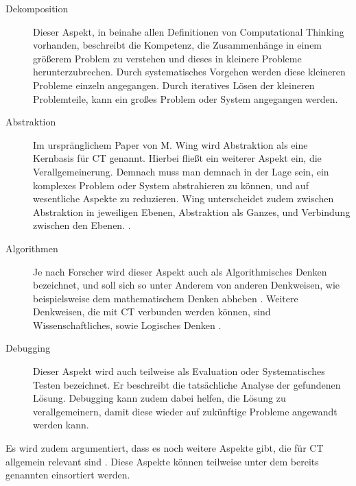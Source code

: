 \begin{description}
    \item[Dekomposition] Dieser Aspekt, in beinahe allen Definitionen von Computational Thinking vorhanden, beschreibt die Kompetenz, die Zusammenhänge in einem größerem Problem zu verstehen und dieses in kleinere Probleme herunterzubrechen. Durch systematisches Vorgehen werden diese kleineren Probleme einzeln angegangen. Durch iteratives Lösen der kleineren Problemteile, kann ein großes Problem oder System angegangen werden.
    \item[Abstraktion] Im urspränglichem Paper von M. Wing wird Abstraktion als eine Kernbasis für CT genannt. Hierbei fließt ein weiterer Aspekt ein, die Verallgemeinerung.
    Demnach muss man demnach in der Lage sein, ein komplexes Problem oder System abstrahieren zu können, und auf wesentliche Aspekte zu reduzieren. Wing unterscheidet zudem zwischen Abstraktion in jeweiligen Ebenen, Abstraktion als Ganzes, und Verbindung zwischen den Ebenen. \cite{wing2008}.
    \item[Algorithmen] Je nach Forscher wird dieser Aspekt auch als Algorithmisches Denken bezeichnet, und soll sich so unter Anderem von anderen Denkweisen, wie beispielsweise dem mathematischem Denken abheben \cite{schute}. Weitere Denkweisen, die mit CT verbunden werden können, sind Wissenschaftliches, sowie Logisches Denken \cite{curzon}.
    \item[Debugging] Dieser Aspekt wird auch teilweise als Evaluation \cite{curzon} oder Systematisches Testen \cite{wing2006} bezeichnet. Er beschreibt die tatsächliche Analyse der gefundenen Lösung. Debugging kann zudem dabei helfen, die Lösung zu verallgemeinern, damit diese wieder auf zukünftige Probleme angewandt werden kann.
\end{description}

Es wird zudem argumentiert, dass es noch weitere Aspekte gibt, die für CT allgemein relevant sind \cite{curzon}. Diese Aspekte können teilweise unter dem bereits genannten einsortiert werden.

